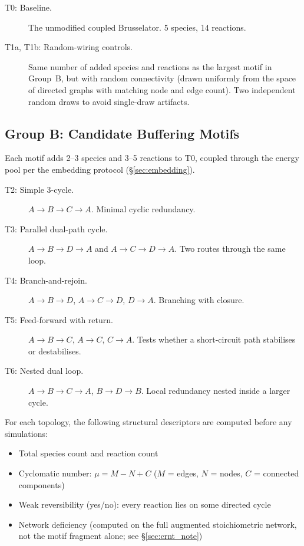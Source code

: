 \documentclass[aps,prl,twocolumn,superscriptaddress,floatfix]{revtex4-2}
\begin{document}
\begin{description}
  \item[T0: Baseline.] The unmodified coupled Brusselator.
    5 species, 14 reactions.

  \item[T1a, T1b: Random-wiring controls.] Same number of added
    species and reactions as the largest motif in Group~B, but
    with random connectivity (drawn uniformly from the space of
    directed graphs with matching node and edge count).  Two
    independent random draws to avoid single-draw artifacts.
\end{description}

\subsection{Group B: Candidate Buffering Motifs}

Each motif adds 2--3 species and 3--5 reactions to T0, coupled
through the energy pool per the embedding protocol
(\S\ref{sec:embedding}).

\begin{description}
  \item[T2: Simple 3-cycle.]
    $A \to B \to C \to A$.  Minimal cyclic redundancy.

  \item[T3: Parallel dual-path cycle.]
    $A \to B \to D \to A$ and $A \to C \to D \to A$.
    Two routes through the same loop.

  \item[T4: Branch-and-rejoin.]
    $A \to B \to D$, $A \to C \to D$, $D \to A$.
    Branching with closure.

  \item[T5: Feed-forward with return.]
    $A \to B \to C$, $A \to C$, $C \to A$.
    Tests whether a short-circuit path stabilises or destabilises.

  \item[T6: Nested dual loop.]
    $A \to B \to C \to A$, $B \to D \to B$.
    Local redundancy nested inside a larger cycle.
\end{description}

For each topology, the following structural descriptors are
computed before any simulations:

\begin{itemize}
  \item Total species count and reaction count
  \item Cyclomatic number: $\mu = M - N + C$
    ($M$ = edges, $N$ = nodes, $C$ = connected components)
  \item Weak reversibility (yes/no): every reaction lies on
    some directed cycle
  \item Network deficiency (computed on the full augmented
    stoichiometric network, not the motif fragment alone;
    see \S\ref{sec:crnt_note})
\end{itemize}
\end{document}
